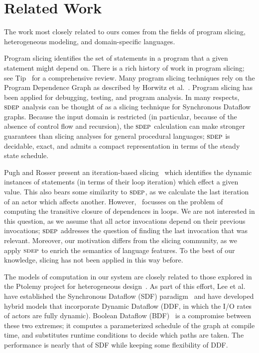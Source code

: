 \section{Related Work}

The work most closely related to ours comes from the fields of program
slicing, heterogeneous modeling, and domain-specific languages.

Program slicing identifies the set of statements in a program that a
given statement might depend on.  There is a rich history of work in
program slicing; see Tip~\cite{tip95slice} for a comprehensive review.
Many program slicing techniques rely on the Program Dependence Graph
as described by Horwitz et al.~\cite{hrb88pdg}.  Program slicing has
been applied for debugging, testing, and program analysis.  In many
respects, $\textsc{sdep}$ analysis can be thought of as a slicing technique
for Synchronous Dataflow graphs.  Because the input domain is
restricted (in particular, because of the absence of control flow and
recursion), the $\textsc{sdep}$ calculation can make stronger guarantees than
slicing analyses for general procedural languages; $\textsc{sdep}$ is
decidable, exact, and admits a compact representation in terms of the
steady state schedule.

Pugh and Rosser present an iteration-based slicing~\cite{pugh97slice}
which identifies the dynamic instances of statements (in terms of
their loop iteration) which effect a given value.  This also bears
some similarity to $\textsc{sdep}$, as we calculate the last iteration of an
actor which affects another.  However,~\cite{pugh97slice} focusses on the
problem of computing the transitive closure of dependences in loops.
We are not interested in this question, as we assume that all actor
invocations depend on their previous invocations; $\textsc{sdep}$ addresses
the question of finding the last invocation that was relevant.
Moreover, our motivation differs from the slicing community, as we
apply $\textsc{sdep}$ to enrich the semantics of language features.  To the
best of our knowledge, slicing has not been applied in this way
before.

The models of computation in our system are closely related to those
explored in the Ptolemy project for heterogeneous
design~\cite{ptolemy03overview}.  As part of this effort, Lee et
al. have established the Synchronous Dataflow (SDF)
paradigm~\cite{LM87-i} and have developed hybrid models that
incorporate Dynamic Dataflow (DDF, in which the I/O rates of actors
are fully dynamic).  Boolean Dataflow (BDF)~\cite{ha97profile} is a
compromise between these two extremes; it computes a parameterized
schedule of the graph at compile time, and substitutes runtime
conditions to decide which paths are taken.  The performance is nearly
that of SDF while keeping some flexibility of DDF.  


